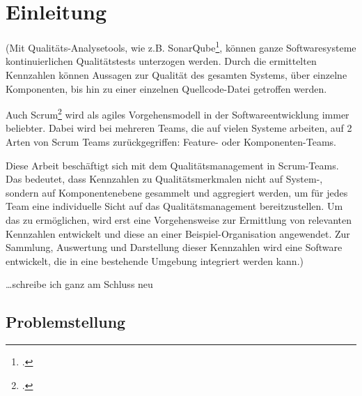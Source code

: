 \chapter{Einleitung}

(Mit Qualitäts-Analysetools, wie z.B. SonarQube\footcite{sonarqube}, können ganze Softwaresysteme kontinuierlichen Qualitätstests unterzogen werden.
Durch die ermittelten Kennzahlen können Aussagen zur Qualität des gesamten Systems, über einzelne Komponenten, bis hin zu einer einzelnen Quellcode-Datei getroffen werden.

Auch Scrum\footcite{scrum} wird als agiles Vorgehensmodell in der Softwareentwicklung immer beliebter. 
Dabei wird bei mehreren Teams, die auf vielen Systeme arbeiten, auf 2 Arten von Scrum Teams zurückgegriffen:
Feature- oder Komponenten-Teams.

Diese Arbeit beschäftigt sich mit dem Qualitätsmanagement in Scrum-Teams.
Das bedeutet, dass Kennzahlen zu Qualitätsmerkmalen nicht auf System-, sondern auf Komponentenebene gesammelt und aggregiert werden, um für jedes Team eine individuelle Sicht auf das Qualitätsmanagement bereitzustellen.
Um das zu ermöglichen, wird erst eine Vorgehensweise zur Ermittlung von relevanten Kennzahlen entwickelt und diese an einer Beispiel-Organisation angewendet.
Zur Sammlung, Auswertung und Darstellung dieser Kennzahlen wird eine Software entwickelt, die in eine bestehende Umgebung integriert werden kann.)

\ldots schreibe ich ganz am Schluss neu

\section{Problemstellung}
